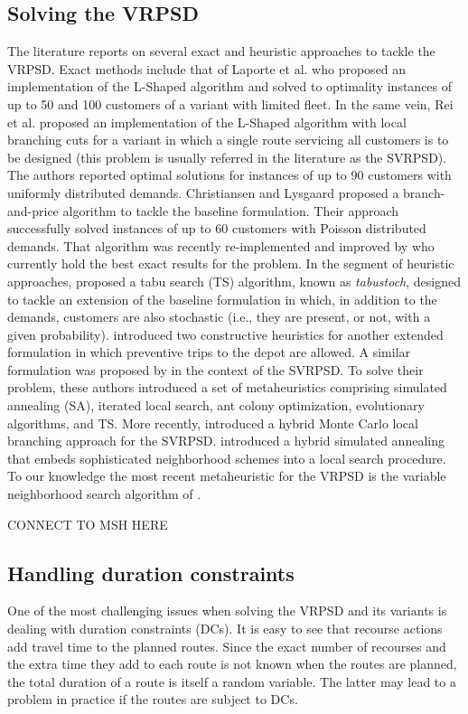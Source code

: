 \subsection{Solving the VRPSD}\label{s.vrpsd.msh}
The literature reports on several exact and heuristic approaches to tackle the VRPSD. Exact methods include that of Laporte et al. \cite{Laporte2002a} who proposed an implementation of the L-Shaped algorithm and solved to optimality instances of up to 50 and 100 customers of a variant with limited fleet. In the same vein, Rei et al. \cite{Rei2007} proposed an implementation of the L-Shaped algorithm with local branching cuts for a variant in which a single route servicing all customers is to be designed (this problem is usually referred in the literature as the SVRPSD). The authors reported optimal solutions for instances of up to 90 customers with uniformly distributed demands. Christiansen and Lysgaard \cite{Christiansen2007} proposed a branch-and-price algorithm to tackle the baseline formulation. Their approach successfully solved instances of up to 60 customers with Poisson distributed demands. That algorithm was recently re-implemented and improved by \cite{Gauvin2014} who currently hold the best exact results for the problem. In the segment of heuristic approaches, \citet{Gendreau1996a} proposed a tabu search (TS) algorithm, known as \emph{tabustoch}, designed to tackle an extension of the baseline formulation in which, in addition to the demands, customers are also stochastic (i.e., they are present, or not, with a given probability). \citet{Yang2000} introduced two constructive heuristics for another extended formulation in which preventive trips to the depot are allowed. A similar formulation was proposed by \citet{Bianchi2006a} in the context of the SVRPSD. To solve their problem, these authors introduced a set of metaheuristics comprising simulated annealing (SA), iterated local search, ant colony optimization, evolutionary algorithms, and TS. More recently, \citet{Rei2010} introduced a hybrid Monte Carlo local branching approach for the SVRPSD. \citet{Goodson2012} introduced a hybrid simulated annealing that embeds sophisticated neighborhood schemes into a local search procedure. To our knowledge the most recent metaheuristic for the VRPSD is the variable neighborhood search algorithm of \cite{Sarasola2016}.

CONNECT TO MSH HERE 

\subsection{Handling duration constraints}\label{s.vrpsd-dc}
One of the most challenging issues when solving the VRPSD and its variants is dealing with duration constraints (DCs). It is easy to see that recourse actions add travel time to the planned routes. Since the exact number of recourses and the extra time they add to each route is not known when the routes are planned, the total duration of a route is itself a random variable. The latter may lead to a problem in practice if the routes are subject to DCs.

